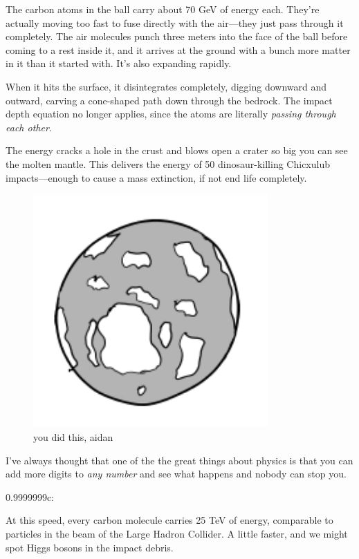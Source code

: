 {The carbon atoms in the ball carry about 70 GeV of energy each. They’re actually moving too fast to fuse directly with the air—they just pass through it completely. The air molecules punch three meters into the face of the ball before coming to a rest inside it, and it arrives at the ground with a bunch more matter in it than it started with. It’s also expanding rapidly.}

{When it hits the surface, it disintegrates completely, digging downward and outward, carving a cone-shaped path down through the bedrock. The impact depth equation no longer applies, since the atoms are literally \emph{passing through each other}.}

{The energy cracks a hole in the crust and blows open a crater so big you can see the molten mantle. This delivers the energy of 50 dinosaur-killing Chicxulub impacts—enough to cause a mass extinction, if not end life completely.}

\begin{figure}[!htbp]
\centering
\includegraphics[scale=0.5, max width=0.8\textwidth]{imgs/a/20/diamond_99.png}
\caption{you did this, aidan}
\end{figure}

{I’ve always thought that one of the the great things about physics is that you can add more digits to \emph{any number} and see what happens and nobody can stop you.}

{0.9999999c:}

{At this speed, every carbon molecule carries 25 TeV of energy, comparable to particles in the beam of the Large Hadron Collider. A little faster, and we might spot Higgs bosons in the impact debris.}

